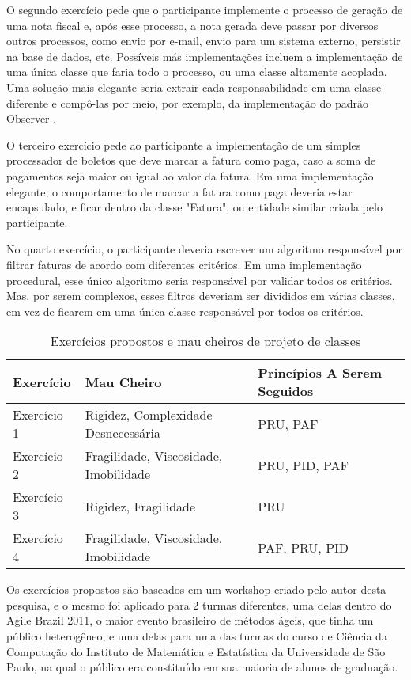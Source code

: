 O segundo exercício pede que o participante implemente o processo de geração de uma nota fiscal e, após
esse processo, a nota gerada deve passar por diversos outros processos, como envio por e-mail, envio
para um sistema externo, persistir na base de dados, etc. Possíveis más implementações incluem a 
implementação de uma única classe que faria todo o processo, ou uma classe altamente acoplada.
Uma solução mais elegante seria extrair cada responsabilidade em uma classe diferente e compô-las
por meio, por exemplo, da implementação do padrão Observer \cite{gof}.

O terceiro exercício pede ao participante a implementação de um simples processador de boletos que
deve marcar a fatura como paga, caso a soma de pagamentos seja maior ou igual ao valor da fatura. 
Em uma implementação elegante, o comportamento de marcar a fatura como paga deveria estar encapsulado, e 
ficar dentro da classe "Fatura", ou entidade similar criada pelo participante.

No quarto exercício, o participante deveria escrever um algoritmo responsável por filtrar faturas de
acordo com diferentes critérios. Em uma implementação procedural, esse único algoritmo seria
responsável por validar todos os critérios. Mas, por serem complexos, esses filtros deveriam ser divididos em 
várias classes, em vez de ficarem em uma única classe responsável por todos os critérios.


\begin{table}
	\centering
	\begin{tabular}{| l | l | l | }
		\hline
		Exercício & Mau Cheiro & Princípios A Serem Seguidos\\
		
		\hline
		
		Exercício 1 & Rigidez, Complexidade Desnecessária & PRU, PAF \\
		Exercício 2 & Fragilidade, Viscosidade, Imobilidade & PRU, PID, PAF \\
		Exercício 3 & Rigidez, Fragilidade & PRU\\
		Exercício 4 & Fragilidade, Viscosidade, Imobilidade & PAF, PRU, PID \\
		
		\hline
	\end{tabular}
	\caption{Exercícios propostos e mau cheiros de projeto de classes}
	\label{tab:problemas-exercicios}
\end{table}

Os exercícios propostos são baseados em um workshop criado pelo autor desta pesquisa, e o mesmo
foi aplicado para 2 turmas diferentes, uma delas dentro do Agile Brazil 2011, o
maior evento brasileiro de métodos ágeis, que tinha um público heterogêneo, e uma delas para
uma das turmas do curso de Ciência da Computação do Instituto de Matemática e Estatística da Universidade
de São Paulo, na qual o público era constituído em sua maioria de alunos de graduação. 

